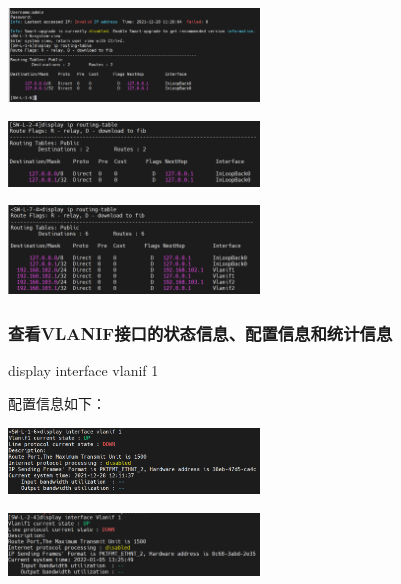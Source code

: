 \documentclass{article}
\begin{document}
\vspace{10pt}
\centerline{\includegraphics[width=0.5\textwidth]{3_1_images/10.png}}
\vspace{10pt}

\vspace{10pt}
\centerline{\includegraphics[width=0.5\textwidth]{3_1_images/11.png}}
\vspace{10pt}

\vspace{10pt}
\centerline{\includegraphics[width=0.5\textwidth]{3_1_images/12.png}}
\vspace{10pt}

\subsubsection{查看VLANIF接口的状态信息、配置信息和统计信息}
display interface vlanif 1

配置信息如下：

\vspace{10pt}
\centerline{\includegraphics[width=0.5\textwidth]{3_1_images/13.png}}
\vspace{10pt}

\vspace{10pt}
\centerline{\includegraphics[width=0.5\textwidth]{3_1_images/14.png}}
\vspace{10pt}
\end{document}
